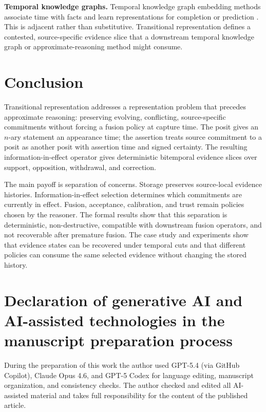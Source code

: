 \documentclass[a4paper,fleqn]{cas-sc}
\theoremstyle{plain}
\theoremstyle{remark}
\begin{document}
\textbf{Temporal knowledge graphs.}
Temporal knowledge graph embedding methods associate time with facts and learn representations for completion or prediction \cite{Lacroix2020}. This is adjacent rather than substitutive. Transitional representation defines a contested, source-specific evidence slice that a downstream temporal knowledge graph or approximate-reasoning method might consume.

\section{Conclusion}
Transitional representation addresses a representation problem that precedes approximate reasoning: preserving evolving, conflicting, source-specific commitments without forcing a fusion policy at capture time. The posit gives an \(n\)-ary statement an appearance time; the assertion treats source commitment to a posit as another posit with assertion time and signed certainty. The resulting information-in-effect operator gives deterministic bitemporal evidence slices over support, opposition, withdrawal, and correction.

The main payoff is separation of concerns. Storage preserves source-local evidence histories. Information-in-effect selection determines which commitments are currently in effect. Fusion, acceptance, calibration, and trust remain policies chosen by the reasoner. The formal results show that this separation is deterministic, non-destructive, compatible with downstream fusion operators, and not recoverable after premature fusion. The case study and experiments show that evidence states can be recovered under temporal cuts and that different policies can consume the same selected evidence without changing the stored history.

\section*{Declaration of generative AI and AI-assisted technologies in the manuscript preparation process}
During the preparation of this work the author used GPT-5.4 (via GitHub Copilot), Claude Opus 4.6, and GPT-5 Codex for language editing, manuscript organization, and consistency checks. The author checked and edited all AI-assisted material and takes full responsibility for the content of the published article.
\end{document}
